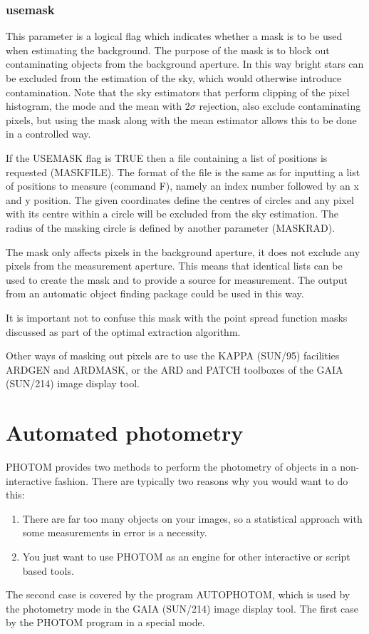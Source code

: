 \documentclass[twoside,11pt]{article}
\newcommand{\htmlref}[2]{#1}
\newcommand{\latex}[1]{#1}
\newcommand{\xref}[3]{#1}
\newcommand{\xlabel}[1]{}
\renewcommand{\_}{\texttt{\symbol{95}}}
\begin{document}
\subsubsection{usemask}

This parameter is a logical flag which indicates whether a mask is to be
used when estimating the background. The purpose of the mask is to block
out contaminating objects from the background aperture. In this way bright
stars can be excluded from the estimation of the sky, which would
otherwise introduce contamination. Note that the sky estimators that
perform clipping of the pixel histogram, the mode and the mean with
$2\sigma$ rejection, also exclude contaminating pixels, but using the mask
along with the mean estimator allows this to be done in a controlled way.

If the USEMASK flag is TRUE then a file containing a list of positions is
requested (MASKFILE). The format of the file is the same as for inputting
a list of positions to measure (command F), namely an index number
followed by an x and y position. The given coordinates define the
centres of circles and any pixel with its centre within a circle will be
excluded from the sky estimation. The radius of the masking circle is
defined by another parameter (MASKRAD).

The mask only affects pixels in the background aperture, it does not
exclude any pixels from the measurement aperture. This means that
identical lists can be used to create the mask and to provide a source
for measurement. The output from an automatic object finding package
could be used in this way.

It is important not to confuse this mask with the point spread function
masks discussed as part of the optimal extraction algorithm.

Other ways of masking out pixels are to use the \xref{KAPPA}{sun95}{}
\latex{(SUN/95)} facilities \xref{ARDGEN}{sun95}{ARDGEN} and
\xref{ARDMASK}{sun95}{ARDMASK}, or the ARD and PATCH toolboxes
of the GAIA (\xref{SUN/214}{sun214}{}) image display tool.

\section{\xlabel{automated_photometry}Automated photometry}

PHOTOM provides two methods to perform the photometry of objects in a
non-interactive fashion. There are typically two reasons why you would
want to do this:
\begin{enumerate}
\item There are far too many objects on your images, so a statistical
      approach with some measurements in error is a necessity.
\item You just want to use PHOTOM as an engine for other interactive
      or script based tools.
\end{enumerate}
The second case is covered by the program
\htmlref{AUTOPHOTOM}{AUTOPHOTOM}, which is used by the photometry mode
in the \xref{GAIA}{sun214}{} (SUN/214) image display tool. The first
case by the \htmlref{PHOTOM}{PHOTOM} program in a special mode.
\end{document}
